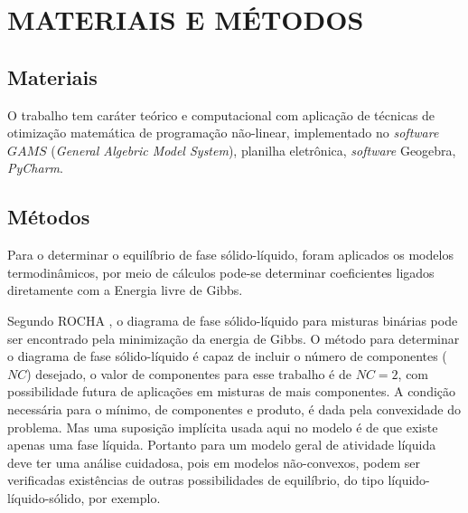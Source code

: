 \chapter{MATERIAIS E MÉTODOS}
\label{Material_metodo}

\section{Materiais}
\hspace{0.5cm} O trabalho tem caráter teórico e computacional com aplicação de técnicas de otimização matemática de programação não-linear, implementado no \textit{software} $GAMS$ (\textit{General Algebric Model System}), planilha eletrônica, \textit{software} Geogebra, \textit{PyCharm}.

\section{Métodos}

\hspace{0.5cm} Para o determinar o equilíbrio de fase sólido-líquido, foram aplicados os modelos termodinâmicos, por meio de cálculos pode-se determinar coeficientes ligados diretamente com a Energia livre de Gibbs.  \cite{Rocha2009a,Costa2007}

Segundo ROCHA \citeyear{Rocha2009a}, o diagrama de fase sólido-líquido para misturas binárias pode ser encontrado pela minimização da energia de Gibbs. O método para determinar o diagrama de fase sólido-líquido é capaz de incluir o número de componentes ($NC$) desejado, o valor de componentes para esse trabalho é de $NC=2$, com possibilidade futura de aplicações em misturas de mais componentes. A condição necessária para o mínimo, de componentes e produto, é dada pela convexidade do problema. Mas uma suposição implícita usada aqui no modelo é de que existe apenas uma fase líquida. Portanto para um modelo geral de atividade líquida deve ter uma análise cuidadosa, pois em modelos não-convexos, podem ser verificadas existências de outras possibilidades de equilíbrio, do tipo líquido-líquido-sólido, por exemplo. 


